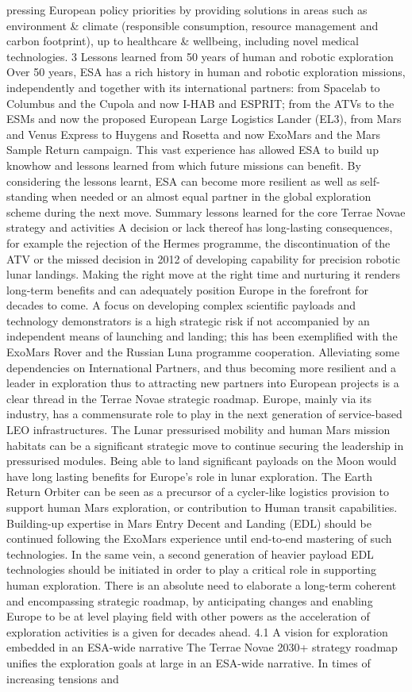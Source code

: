\documentclass[12pt]{article}
\begin{document}
pressing European policy priorities by providing solutions in areas such as environment \& climate (responsible consumption, resource management and carbon footprint), up to healthcare \& wellbeing, including novel medical technologies. 3 Lessons learned from 50 years of human and robotic exploration Over 50 years, ESA has a rich history in human and robotic exploration missions, independently and together with its international partners: from Spacelab to Columbus and the Cupola and now I-HAB and ESPRIT; from the ATVs to the ESMs and now the proposed European Large Logistics Lander (EL3), from Mars and Venus Express to Huygens and Rosetta and now ExoMars and the Mars Sample Return campaign. This vast experience has allowed ESA to build up knowhow and lessons learned from which future missions can benefit. By considering the lessons learnt, ESA can become more resilient as well as self-standing when needed or an almost equal partner in the global exploration scheme during the next move. Summary lessons learned for the core Terrae Novae strategy and activities A decision or lack thereof has long-lasting consequences, for example the rejection of the Hermes programme, the discontinuation of the ATV or the missed decision in 2012 of developing capability for precision robotic lunar landings. Making the right move at the right time and nurturing it renders long-term benefits and can adequately position Europe in the forefront for decades to come. A focus on developing complex scientific payloads and technology demonstrators is a high strategic risk if not accompanied by an independent means of launching and landing; this has been exemplified with the ExoMars Rover and the Russian Luna programme cooperation. Alleviating some dependencies on International Partners, and thus becoming more resilient and a leader in exploration thus to attracting new partners into European projects is a clear thread in the Terrae Novae strategic roadmap. Europe, mainly via its industry, has a commensurate role to play in the next generation of service-based LEO infrastructures. The Lunar pressurised mobility and human Mars mission habitats can be a significant strategic move to continue securing the leadership in pressurised modules. Being able to land significant payloads on the Moon would have long lasting benefits for Europe’s role in lunar exploration. The Earth Return Orbiter can be seen as a precursor of a cycler-like logistics provision to support human Mars exploration, or contribution to Human transit capabilities. Building-up expertise in Mars Entry Decent and Landing (EDL) should be continued following the ExoMars experience until end-to-end mastering of such technologies. In the same vein, a second generation of heavier payload EDL technologies should be initiated in order to play a critical role in supporting human exploration. There is an absolute need to elaborate a long-term coherent and encompassing strategic roadmap, by anticipating changes and enabling Europe to be at level playing field with other powers as the acceleration of exploration activities is a given for decades ahead. 4.1 A vision for exploration embedded in an ESA-wide narrative The Terrae Novae 2030+ strategy roadmap unifies the exploration goals at large in an ESA-wide narrative. In times of increasing tensions and 
\end{document}
